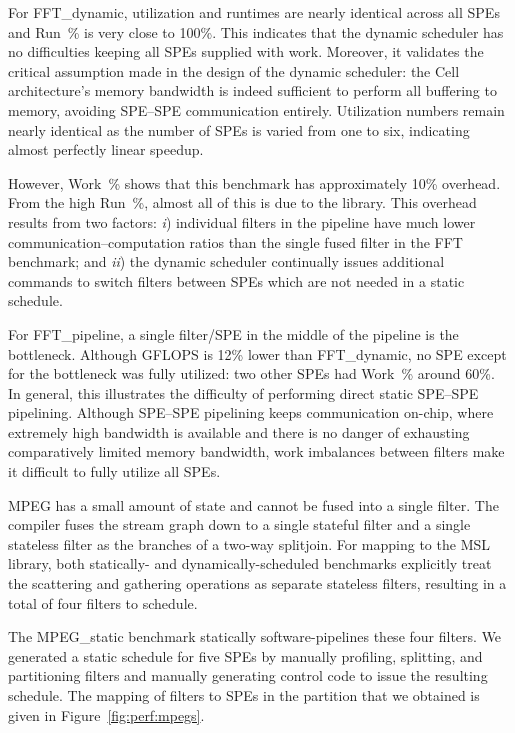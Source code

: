For \textsf{FFT\_dynamic}, utilization and runtimes are nearly identical across all SPEs and Run~\% is very close to 100\%. This indicates that the dynamic scheduler has no difficulties keeping all SPEs supplied with work. Moreover, it validates the critical assumption made in the design of the dynamic scheduler: the Cell architecture's memory bandwidth is indeed sufficient to perform all buffering to memory, avoiding SPE--SPE communication entirely. Utilization numbers remain nearly identical as the number of SPEs is varied from one to six, indicating almost perfectly linear speedup. 

However, Work~\% shows that this benchmark has approximately 10\% overhead. From the high Run~\%, almost all of this is due to the library. This overhead results from two factors: \emph{i}) individual filters in the pipeline have much lower communication--computation ratios than the single fused filter in the \textsf{FFT} benchmark; and \emph{ii}) the dynamic scheduler continually issues additional commands to switch filters between SPEs which are not needed in a static schedule.

For \textsf{FFT\_pipeline}, a single filter/SPE in the middle of the pipeline is the bottleneck. Although GFLOPS is 12\% lower than \textsf{FFT\_dynamic}, no SPE except for the bottleneck was fully utilized: two other SPEs had Work~\% around 60\%. In general, this illustrates the difficulty of performing direct static SPE--SPE pipelining. Although SPE--SPE pipelining keeps communication on-chip, where extremely high bandwidth is available and there is no danger of exhausting comparatively limited memory bandwidth, work imbalances between filters make it difficult to fully utilize all SPEs.

MPEG has a small amount of state and cannot be fused into a single filter. The compiler fuses the stream graph down to a single stateful filter and a single stateless filter as the branches of a two-way splitjoin. For mapping to the MSL library, both statically- and dynamically-scheduled benchmarks explicitly treat the scattering and gathering operations as separate stateless filters, resulting in a total of four filters to schedule.

The \textsf{MPEG\_static} benchmark statically software-pipelines these four filters. We generated a static schedule for five SPEs by manually profiling, splitting, and partitioning filters and manually generating control code to issue the resulting schedule. The mapping of filters to SPEs in the partition that we obtained is given in Figure~\ref{fig:perf:mpegs}.

